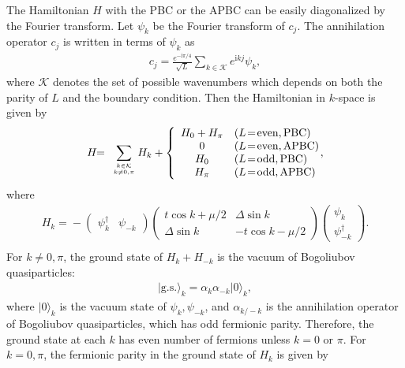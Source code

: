 \documentclass[aps, prb, showpacs, twocolumn, %
amssymb,superscriptaddress]{revtex4}
\newcommand{\ii}{\text{i}}
\begin{document}
The Hamiltonian $H$ with the PBC or the APBC can be easily diagonalized by the Fourier transform. Let $\psi_k$ be the Fourier transform of $c_j$. The annihilation operator $c_j$ is written in terms of $\psi_k$ as
\begin{align}
c_{j} = \frac{e^{ - \ii \pi/4}}{\sqrt{L}} \sum_{k \in \mathcal{K}} e^{\ii kj} \psi_{k},
	\label{eq:Fermi Fourier}
\end{align}
where $\mathcal{K}$ denotes the set of possible wavenumbers which depends on both the parity of $L$ and the boundary condition. 
Then the Hamiltonian in $k$-space is given by
\begin{eqnarray}\label{FourierHam}
H \!\!&=&\!\! \sum_{k\in\mathcal{K} \atop k\neq 0,\pi}H_{k} + 
\left\{
\begin{array}{cl}
H_0 + H_\pi & (L\!=\!{\rm even}, {\rm PBC}) \\
0 & (L\!=\!{\rm even}, {\rm APBC}) \\
H_0 & (L\!=\!{\rm odd}, {\rm PBC}) \\
H_\pi & (L\!=\!{\rm odd}, {\rm APBC})
\end{array}
\right.\!\!\!\!,
\end{eqnarray}
where
\begin{eqnarray}
H_{k} \!=\! - \begin{pmatrix} \psi_{k}^{\dagger} & \psi_{-k} \end{pmatrix} \!\!
\begin{pmatrix} t \cos k + \mu/2 & \Delta \sin k \\ \Delta \sin k & -t \cos k - \mu/2  \end{pmatrix}\!\!
\begin{pmatrix} \psi_k \\ \psi_{-k}^\dagger \end{pmatrix}. \nonumber
\\
\end{eqnarray}
For $k\neq 0, \pi$, the ground state of $H_{k}+H_{-k}$ is the vacuum of Bogoliubov quasiparticles:
\begin{eqnarray}
\lvert\mathrm{g.s.}\rangle_k = \alpha_k\alpha_{-k}\lvert0\rangle_k,
\end{eqnarray}
where $\lvert0\rangle_k$ is the vacuum state of $\psi_k, \psi_{-k}$, and $\alpha_{k/-k}$ is the annihilation operator of Bogoliubov quasiparticles, which has odd fermionic parity. Therefore, the ground state at each $k$ has even number of fermions unless $k=0$ or $\pi$. %
For $k=0, \pi$, the fermionic parity in the ground state of $H_k$ is given by
\end{document}

